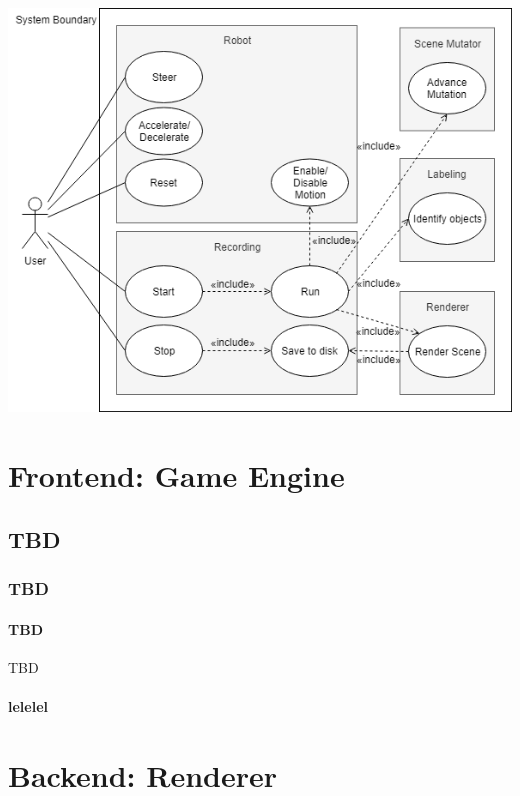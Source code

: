 \begin{center}
\noindent\includegraphics[width=15cm]{tex/img/ch04/Use_Cases_03.png}
\label{fig:use-cases}
\end{center}

\section{Frontend: Game Engine}

\subsection{TBD}

\subsubsection{TBD}
 
\paragraph{TBD} TBD
\paragraph{lelelel}

\section{Backend: Renderer}